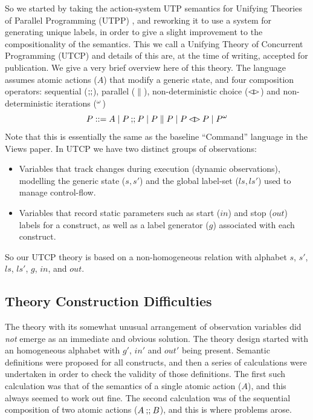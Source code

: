 So we started by taking the action-system UTP semantics for Unifying Theories
of Parallel Programming (UTPP) \cite{DBLP:conf/icfem/WoodcockH02},
and reworking it to use a system for generating unique labels,
in order to give a slight improvement to the compositionality
of the semantics. This we call a Unifying Theory of Concurrent Programming
(UTCP) and details of this are,
at the time of writing,
accepted for publication\cite{conf/tase/BMN16}.
We give a very brief overview here of this theory.
The language assumes atomic actions ($A$) that modify a generic state,
and four composition operators: sequential ($\mathrel{\mathbf{;\!;}}$), parallel ($\parallel$),
non-deterministic choice ($\mathbin{\lhd\!\rhd}$) and non-deterministic iterations (${}^{\omega}$)
\[
   P ::= A \mid P \mathbin{\mathbf{;\!;}} P \mid P \parallel P \mid P \mathbin{\lhd\!\rhd} P \mid {P}^{\omega}
\]
Note that this is essentially the same as the baseline ``Command'' language
in the Views paper\cite{conf/popl/Dinsdale-YoungBGPY13}.
In UTCP we have two distinct groups of observations:
\begin{itemize}
  \item
    Variables that track changes during execution
    (dynamic observations),
    modelling the generic state ($s,s'$)
    and the global label-set ($ls,ls'$) used to manage control-flow.
  \item
    Variables that record static parameters such as start ($in$)
    and stop ($out$) labels for a construct,
    as well as a label generator ($g$) associated with each construct.
\end{itemize}
So our UTCP theory is based on a non-homogeneous relation
with alphabet $s$, $s'$, $ls$, $ls'$, $g$, $in$, and $out$.


\subsection{Theory Construction Difficulties}\label{ssec:difficulties}

The theory with its somewhat unusual arrangement of observation variables
did \emph{not} emerge as an immediate and obvious solution.
The theory design started with an homogeneous alphabet with $g'$, $in'$ and $out'$
being present.
Semantic definitions were proposed for all constructs,
and then a series of calculations were undertaken in order to check
the validity of those definitions.
The first such calculation was that of the semantics of a single atomic
action ($A$), and this always seemed to work out fine.
The second calculation was of the sequential composition of two atomic
actions ($A\mathbin{\mathbf{;\!;}} B$), and this is where problems arose.

